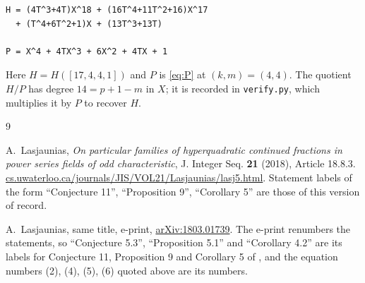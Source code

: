 \documentclass[11pt]{amsart}
\theoremstyle{remark}
\begin{document}
\begin{verbatim}
H = (4T^3+4T)X^18 + (16T^4+11T^2+16)X^17
  + (T^4+6T^2+1)X + (13T^3+13T)

P = X^4 + 4TX^3 + 6X^2 + 4TX + 1
\end{verbatim}

\noindent
Here $H=H([17,4,4,1])$ and $P$ is \eqref{eq:P} at $(k,m)=(4,4)$. The quotient $H/P$ has degree
$14=p+1-m$ in $X$; it is recorded in \texttt{verify.py}, which multiplies it by $P$ to recover $H$.

\begin{thebibliography}{9}

A.~Lasjaunias,
\emph{On particular families of hyperquadratic continued fractions in power series fields of odd
characteristic},
J. Integer Seq. \textbf{21} (2018), Article 18.8.3.
\href{https://cs.uwaterloo.ca/journals/JIS/VOL21/Lasjaunias/lasj5.html}%
{cs.uwaterloo.ca/journals/JIS/VOL21/Lasjaunias/lasj5.html}.
Statement labels of the form ``Conjecture 11'', ``Proposition 9'', ``Corollary 5'' are those of
this version of record.

A.~Lasjaunias, same title, e-print,
\href{https://arxiv.org/abs/1803.01739}{arXiv:1803.01739}.
The e-print renumbers the statements, so ``Conjecture 5.3'', ``Proposition 5.1'' and
``Corollary 4.2'' are its labels for Conjecture 11, Proposition 9 and Corollary 5 of \cite{L}, and
the equation numbers (2), (4), (5), (6) quoted above are its numbers.

\end{thebibliography}
\end{document}
